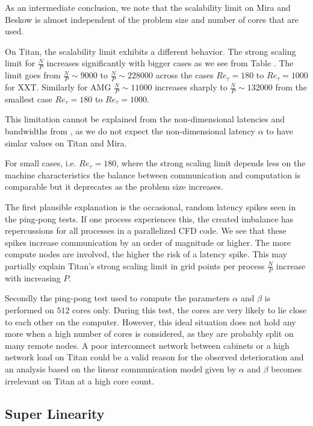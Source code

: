 \documentclass{sig-alternate}
\begin{document}
As an intermediate conclusion, we note that the scalability limit on Mira and Beskow is almost independent of the problem size and number of cores that are used. 

 On Titan, the scalability limit exhibits a different behavior.
The strong scaling limit for $\frac{N}{P}$ increases
significantly with bigger cases as we see from Table .
The limit goes from $\frac{N}{P} \sim 9000$ to $\frac{N}{P} \sim 228000$ across the cases $Re_{\tau}=180$ to $Re_{\tau}=1000$ for XXT. Similarly for AMG $\frac{N}{P}  \sim 11000$ increases sharply to $\frac{N}{P} \sim 132000$ from the smallest case $Re_{\tau}=180$ to 
$Re_{\tau}=1000$. 

This limitation cannot be explained from the non-dimensional latencies and bandwidths from , as we do not expect the non-dimensional latency $\alpha$ to have simlar values on Titan and Mira. 


For small cases, i.e. $Re_{\tau} = 180$, where the strong scaling limit depends less on the machine characteristics the balance between communication and computation is comparable but it deprecates as the problem size increases. 

The first plausible explanation is the occasional, random latency spikes seen in the ping-pong tests. If
one process experiences this, the created imbalance has repercussions for all
processes in a parallelized CFD code. We see that these spikes increase communication by
an order of magnitude or higher. The more compute nodes are involved, the higher
the risk of a latency spike. This may partially explain Titan's strong
scaling limit in grid points per process $\frac{N}{P}$ increase with increasing $P$.

Secondly the ping-pong test used to compute the parameters $\alpha$ and $\beta$ is performed on $512$ cores only. During this test, the cores are very likely to lie close to each other on the computer. 
However, this ideal situation does not hold any more when a high number of cores
is considered, as they are probably split on many remote nodes.
A poor interconnect network between cabinets or a high network load on Titan 
could be a valid reason for the observed deterioration and an analysis based on the linear communication model given by  
$\alpha$ and $\beta$  becomes irrelevant on Titan at a high core count.



\subsection{Super Linearity}
\end{document}
